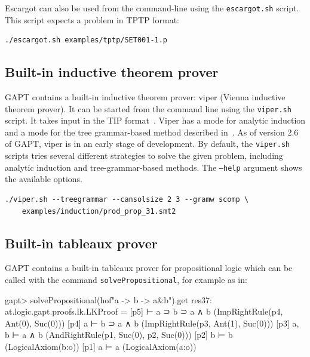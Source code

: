 \documentclass[a4paper,11pt]{article}
\begin{document}
Escargot can also be used from the command-line using the \texttt{escargot.sh}
script.  This script expects a problem in TPTP format:
\begin{lstlisting}
./escargot.sh examples/tptp/SET001-1.p
\end{lstlisting}

\subsection{Built-in inductive theorem prover}

GAPT contains a built-in inductive theorem prover: viper (Vienna inductive theorem prover). It
can be started from the command line using the \texttt{viper.sh} script. It takes input in the
TIP format~\cite{Claessen15TIP}. Viper has a mode for analytic induction and a mode for 
the tree grammar-based method described in~\cite{Eberhard15Inductive}. As of version 2.6 of GAPT,
viper is in an early stage of development.  By default, the \texttt{viper.sh}
scripts tries several different strategies to solve the given problem,
including analytic induction and tree-grammar-based methods.  The
\texttt{--help} argument shows the available options.
\begin{lstlisting}
./viper.sh --treegrammar --cansolsize 2 3 --gramw scomp \
    examples/induction/prod_prop_31.smt2
\end{lstlisting}

\subsection{Built-in tableaux prover}

GAPT contains a built-in tableaux prover for propositional logic
which can be called with the command \texttt{solvePropositional}, for example as in:
\begin{clilisting}
gapt> solvePropositional(hof"a -> b -> a&b").get
res37: at.logic.gapt.proofs.lk.LKProof =
[p5]  ⊢ a ⊃ b ⊃ a ∧ b    (ImpRightRule(p4, Ant(0), Suc(0)))
[p4] a ⊢ b ⊃ a ∧ b    (ImpRightRule(p3, Ant(1), Suc(0)))
[p3] a, b ⊢ a ∧ b    (AndRightRule(p1, Suc(0), p2, Suc(0)))
[p2] b ⊢ b    (LogicalAxiom(b:o))
[p1] a ⊢ a    (LogicalAxiom(a:o))

\end{clilisting}
\end{document}
